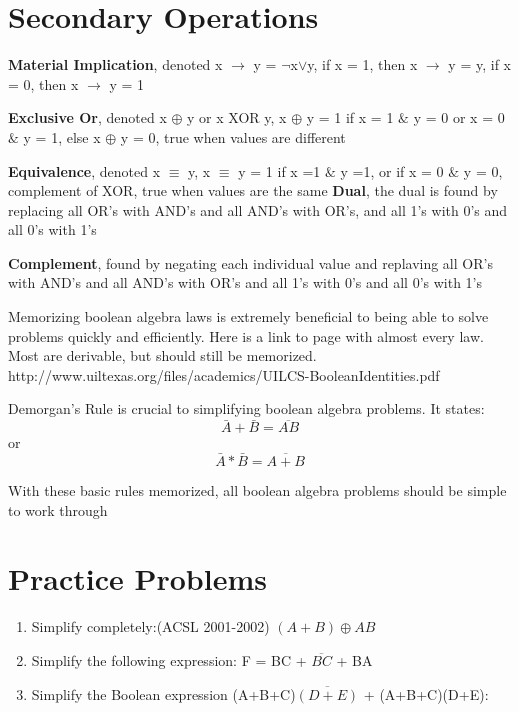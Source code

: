 \documentclass{article}
\begin{document}
\section{Secondary Operations}

\textbf{Material Implication}, denoted  x $\rightarrow$ y = $\neg$x$\lor$y, if x = 1, then x $\rightarrow$ y = y, if x = 0, then x $\rightarrow$ y = 1

\noindent
\textbf{Exclusive Or}, denoted x $\oplus$ y or x XOR y, x $\oplus$ y = 1 if x = 1 $\&$ y = 0 or x = 0 $\&$ y = 1, else x $\oplus$ y = 0, true when values are different

\noindent
\textbf{Equivalence}, denoted x $\equiv$ y, x $\equiv$ y = 1 if x =1 $\&$ y =1, or if x = 0 $\&$ y = 0, complement of XOR, true when values are the same
\noindent
\textbf{Dual}, the dual is found by replacing all OR's with AND's and all AND's with OR's, and all 1's with 0's and all 0's with 1's

\noindent
\textbf{Complement}, found by negating each individual value and replaving all OR's with AND's and all AND's with OR's and all 1's with 0's and all 0's with 1's
\bigskip

\noindent
Memorizing boolean algebra laws is extremely beneficial to being able to solve problems quickly and efficiently. Here is a link to page with almost every law. Most are derivable, but should still be memorized.  http://www.uiltexas.org/files/academics/UILCS-BooleanIdentities.pdf

Demorgan's Rule is crucial to simplifying boolean algebra problems. It states: $$ \bar{A} + \bar{B} = \overline{AB}$$ or $$ \bar{A} * \bar{B} = \overline{A+B}$$

\bigskip

\noindent
With these basic rules memorized, all boolean algebra problems should be simple to work through

\section{Practice Problems}
\begin{enumerate}
\item Simplify completely:(ACSL 2001-2002)
$( A + B )\oplus A B$

\item Simplify the following expression: F = BC + $\overline{BC}$ + BA

\item Simplify the Boolean expression (A+B+C)$\overline{(D+E)}$ + (A+B+C)(D+E):
\end{enumerate}
\end{document}
